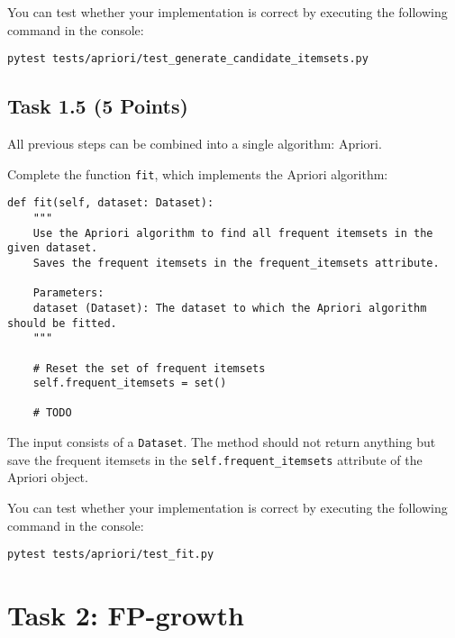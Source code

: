 \documentclass[
english,
smallborders
]{i6prcsht}
\newcommand{\points}[1]{\hfill \color{red}(#1 Points)\color{black}}
\begin{document}
You can test whether your implementation is correct by executing the following command in the console:

\vspace*{0.3cm}

\begin{lstlisting}
pytest tests/apriori/test_generate_candidate_itemsets.py
\end{lstlisting}

\vspace*{0.1cm}

\subsection*{Task 1.5 \points{5}}

All previous steps can be combined into a single algorithm: Apriori.

Complete the function \texttt{fit}, which implements the Apriori algorithm:

\vspace*{0.3cm}

\begin{lstlisting}
def fit(self, dataset: Dataset):
	"""
	Use the Apriori algorithm to find all frequent itemsets in the given dataset.
	Saves the frequent itemsets in the frequent_itemsets attribute.

	Parameters:
	dataset (Dataset): The dataset to which the Apriori algorithm should be fitted.
	"""

	# Reset the set of frequent itemsets
	self.frequent_itemsets = set()

	# TODO
\end{lstlisting}

\vspace*{0.1cm}

The input consists of a \texttt{Dataset}. The method should not return anything but save the frequent itemsets in the \texttt{self.frequent\_itemsets} attribute of the Apriori object.

You can test whether your implementation is correct by executing the following command in the console:

\vspace*{0.3cm}

\begin{lstlisting}
pytest tests/apriori/test_fit.py
\end{lstlisting}


\newpage

\section*{Task 2: FP-growth}
\label{sec:task-two}
\end{document}

